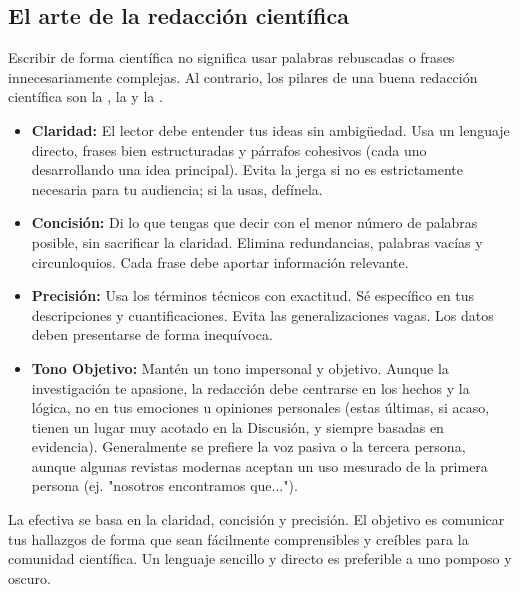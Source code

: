 \subsection*{El arte de la redacción científica}
\label{sub:redaccionclara}

Escribir de forma científica no significa usar palabras rebuscadas o frases
innecesariamente complejas.
Al contrario, los pilares de una buena redacción científica son la
, la  y la .

\begin{itemize}
  \item \textbf{Claridad:} El lector debe entender tus ideas sin ambigüedad.
        Usa un lenguaje directo, frases bien estructuradas y párrafos cohesivos
        (cada uno desarrollando una idea principal).
        Evita la jerga si no es estrictamente necesaria para tu audiencia; si la
        usas, defínela.
  \item \textbf{Concisión:} Di lo que tengas que decir con el menor número de
        palabras posible, sin sacrificar la claridad.
        Elimina redundancias, palabras vacías y circunloquios.
        Cada frase debe aportar información relevante.
  \item \textbf{Precisión:} Usa los términos técnicos con exactitud.
        Sé específico en tus descripciones y cuantificaciones.
        Evita las generalizaciones vagas.
        Los datos deben presentarse de forma inequívoca.
  \item \textbf{Tono Objetivo:} Mantén un tono impersonal y objetivo.
        Aunque la investigación te apasione, la redacción debe centrarse en los
        hechos y la lógica, no en tus emociones u opiniones personales (estas
        últimas, si acaso, tienen un lugar muy acotado en la Discusión, y siempre
        basadas en evidencia).
        Generalmente se prefiere la voz pasiva o la tercera persona, aunque algunas
        revistas modernas aceptan un uso mesurado de la primera persona (ej. "nosotros
        encontramos que...").
\end{itemize}

\begin{remember}
  \label{rem:claridadcientifica}
  La  efectiva se basa en la claridad,
  concisión y precisión.
  El objetivo es comunicar tus hallazgos de forma que sean fácilmente
  comprensibles y creíbles para la comunidad científica.
  Un lenguaje sencillo y directo es preferible a uno pomposo y oscuro.
\end{remember}

